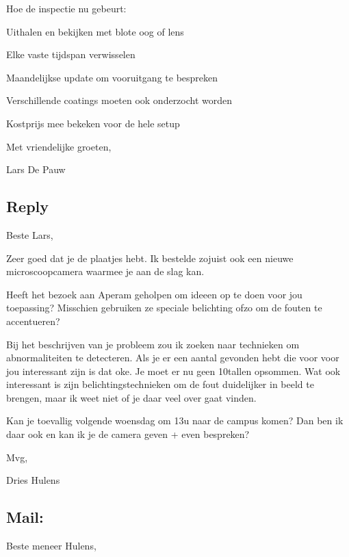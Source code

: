 \documentclass{article}
\begin{document}
Hoe de inspectie nu gebeurt:

Uithalen en bekijken met blote oog of lens

Elke vaste tijdspan verwisselen

Maandelijkse update om vooruitgang te bespreken

Verschillende coatings moeten ook onderzocht worden

Kostprijs mee bekeken voor de hele setup

 

Met vriendelijke groeten,

 

Lars De Pauw



\subsection{Reply}

Beste Lars,



Zeer goed dat je de plaatjes hebt. Ik bestelde zojuist ook een nieuwe microscoopcamera waarmee je aan de slag kan.



Heeft het bezoek aan Aperam geholpen om ideeen op te doen voor jou toepassing? Misschien gebruiken ze speciale belichting ofzo om de fouten te accentueren?



Bij het beschrijven van je probleem zou ik zoeken naar technieken om abnormaliteiten te detecteren. Als je er een aantal gevonden hebt die voor voor jou interessant zijn is dat oke. Je moet er nu geen 10tallen opsommen. Wat ook interessant is zijn belichtingstechnieken om de fout duidelijker in beeld te brengen, maar ik weet niet of je daar veel over gaat vinden.



 Kan je toevallig volgende woensdag om 13u naar de campus komen? Dan ben ik daar ook en kan ik je de camera geven + even bespreken?



Mvg,



Dries Hulens



\subsection{Mail:}

Beste meneer Hulens,
\end{document}
